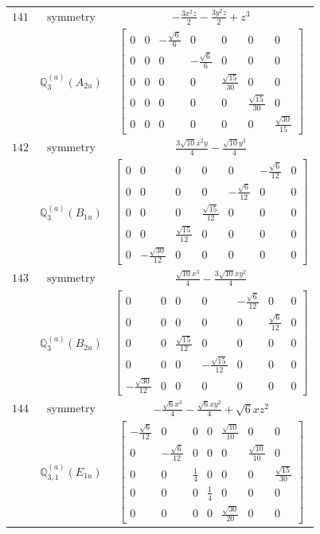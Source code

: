 \documentclass[fleqn,8pt,landscape]{jsarticle}
\begin{document}
\begin{longtable}{ccc}
$ 141 $ & $ \text{symmetry} $ & $ - \frac{3 x^{2} z}{2} - \frac{3 y^{2} z}{2} + z^{3} $ \\
$  $ & $ \mathbb{Q}_{3}^{(a)}(A_{2u}) $ & $ \begin{bmatrix} 0 & 0 & - \frac{\sqrt{6}}{6} & 0 & 0 & 0 & 0 \\ 0 & 0 & 0 & - \frac{\sqrt{6}}{6} & 0 & 0 & 0 \\ 0 & 0 & 0 & 0 & \frac{\sqrt{15}}{30} & 0 & 0 \\ 0 & 0 & 0 & 0 & 0 & \frac{\sqrt{15}}{30} & 0 \\ 0 & 0 & 0 & 0 & 0 & 0 & \frac{\sqrt{30}}{15} \end{bmatrix} $ \\ \hline
$ 142 $ & $ \text{symmetry} $ & $ \frac{3 \sqrt{10} x^{2} y}{4} - \frac{\sqrt{10} y^{3}}{4} $ \\
$  $ & $ \mathbb{Q}_{3}^{(a)}(B_{1u}) $ & $ \begin{bmatrix} 0 & 0 & 0 & 0 & 0 & - \frac{\sqrt{6}}{12} & 0 \\ 0 & 0 & 0 & 0 & - \frac{\sqrt{6}}{12} & 0 & 0 \\ 0 & 0 & 0 & \frac{\sqrt{15}}{12} & 0 & 0 & 0 \\ 0 & 0 & \frac{\sqrt{15}}{12} & 0 & 0 & 0 & 0 \\ 0 & - \frac{\sqrt{30}}{12} & 0 & 0 & 0 & 0 & 0 \end{bmatrix} $ \\ \hline
$ 143 $ & $ \text{symmetry} $ & $ \frac{\sqrt{10} x^{3}}{4} - \frac{3 \sqrt{10} x y^{2}}{4} $ \\
$  $ & $ \mathbb{Q}_{3}^{(a)}(B_{2u}) $ & $ \begin{bmatrix} 0 & 0 & 0 & 0 & - \frac{\sqrt{6}}{12} & 0 & 0 \\ 0 & 0 & 0 & 0 & 0 & \frac{\sqrt{6}}{12} & 0 \\ 0 & 0 & \frac{\sqrt{15}}{12} & 0 & 0 & 0 & 0 \\ 0 & 0 & 0 & - \frac{\sqrt{15}}{12} & 0 & 0 & 0 \\ - \frac{\sqrt{30}}{12} & 0 & 0 & 0 & 0 & 0 & 0 \end{bmatrix} $ \\ \hline
$ 144 $ & $ \text{symmetry} $ & $ - \frac{\sqrt{6} x^{3}}{4} - \frac{\sqrt{6} x y^{2}}{4} + \sqrt{6} x z^{2} $ \\
$  $ & $ \mathbb{Q}_{3,1}^{(a)}(E_{1u}) $ & $ \begin{bmatrix} - \frac{\sqrt{6}}{12} & 0 & 0 & 0 & \frac{\sqrt{10}}{10} & 0 & 0 \\ 0 & - \frac{\sqrt{6}}{12} & 0 & 0 & 0 & \frac{\sqrt{10}}{10} & 0 \\ 0 & 0 & \frac{1}{4} & 0 & 0 & 0 & \frac{\sqrt{15}}{30} \\ 0 & 0 & 0 & \frac{1}{4} & 0 & 0 & 0 \\ 0 & 0 & 0 & 0 & \frac{\sqrt{30}}{20} & 0 & 0 \end{bmatrix} $ \\ \hline

\end{longtable}
\end{document}
